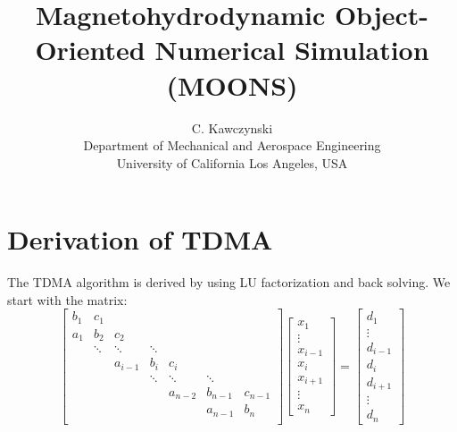 \documentclass[landscape]{article}
\begin{document}
\doublespacing
\title{Magnetohydrodynamic Object-Oriented Numerical Simulation (MOONS)}
\author{C. Kawczynski \\
Department of Mechanical and Aerospace Engineering \\
University of California Los Angeles, USA\\
}
\maketitle
\section{Derivation of TDMA}
The TDMA algorithm is derived by using LU factorization and back solving. We start with the matrix:
\[
\left[
\begin{array}{ccccccccc}
b_{1} & c_{1}    &           &           &           &           &         \\
a_{1} & b_{2}    & c_{2}     &           &           &           &         \\
      & \ddots   & \ddots    & \ddots    &           &           &         \\
      &          & a_{i-1}   & b_{i}     & c_{i}     &           &         \\
      &          &           & \ddots    & \ddots    & \ddots    &         \\
      &          &           &           & a_{n-2}   & b_{n-1}   & c_{n-1} \\
      &          &           &           &           & a_{n-1}   & b_{n}   \\
\end{array} \right] 
\left[ \begin{array}{c}
x_{1} \\ \vdots \\ x_{i-1} \\ x_{i} \\ x_{i+1} \\ \vdots \\ x_{n}
\end{array} \right]
=
\left[ \begin{array}{c}
d_{1} \\ \vdots \\ d_{i-1} \\ d_{i} \\ d_{i+1} \\ \vdots \\ d_{n}
\end{array} \right]
\]
\end{document}
